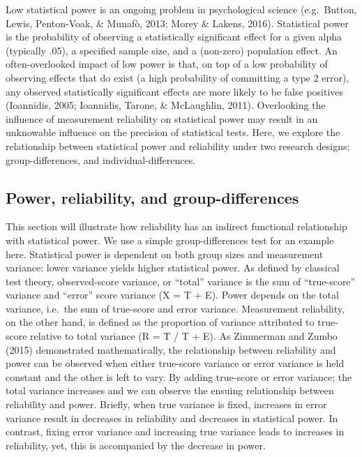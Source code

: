 \documentclass[english,,man,floatsintext]{apa6}
\begin{document}
Low statistical power is an ongoing problem in psychological science (e.g.~Button, Lewis, Penton-Voak, \& Munafò, 2013; Morey \& Lakens, 2016). Statistical power is the probability of observing a statistically significant effect for a given alpha (typically .05), a specified sample size, and a (non-zero) population effect. An often-overlooked impact of low power is that, on top of a low probability of observing effects that do exist (a high probability of committing a type 2 error), any observed statistically significant effects are more likely to be false positives (Ioannidis, 2005; Ioannidis, Tarone, \& McLaughlin, 2011). Overlooking the influence of measurement reliability on statistical power may result in an unknowable influence on the precision of statistical tests. Here, we explore the relationship between statistical power and reliability under two research designs; group-differences, and individual-differences.

\hypertarget{power-reliability-and-group-differences}{%
\subsection{Power, reliability, and group-differences}\label{power-reliability-and-group-differences}}

This section will illustrate how reliability has an indirect functional relationship with statistical power. We use a simple group-differences test for an example here. Statistical power is dependent on both group sizes and measurement variance: lower variance yields higher statistical power. As defined by classical test theory, observed-score variance, or \enquote{total} variance is the sum of \enquote{true-score} variance and \enquote{error} score variance (X = T + E). Power depends on the total variance, i.e.~the sum of true-score and error variance. Measurement reliability, on the other hand, is defined as the proportion of variance attributed to true-score relative to total variance (R = T / T + E). As Zimmerman and Zumbo (2015) demonstrated mathematically, the relationship between reliability and power can be observed when either true-score variance or error variance is held constant and the other is left to vary. By adding true-score or error variance; the total variance increases and we can observe the ensuing relationship between reliability and power. Briefly, when true variance is fixed, increases in error variance result in decreases in reliability and decreases in statistical power. In contrast, fixing error variance and increasing true variance leads to increases in reliability, yet, this is accompanied by the decrease in power.
\end{document}
